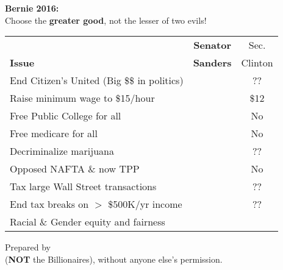 \newcommand{\checkbox}{\makebox[0pt][l]{$\square$}\raisebox{.15ex}{\hspace{0.1em}$\checkmark$}}
\setlength{\baselineskip}{8.25pt}
\vspace{-11pt}

\begin{center}
  {\Huge\bf Bernie 2016:}\\

  {\small Choose the {\bf greater good}, not the lesser of two evils!}\\[5pt]

  \begin{tabular}{l|@{\hskip 1pt}c@{\hskip 1pt}|@{\hskip 1pt}c}
\setlength{\tabcolsep}{0pt}
                  & {\bf\small Senator} & Sec.      \\
\bf Issue         & {\bf\small Sanders} & Clinton \\
\hline
End Citizen's United (Big \$\$ in politics)  & \checkbox &	??	\\
Raise minimum wage to \$15/hour              & \checkbox &	\$12	\\
Free Public College for all                  & \checkbox &	No	\\
Free medicare for all                        & \checkbox &	No	\\
Decriminalize marijuana                      & \checkbox &	??	\\
Opposed NAFTA \& now TPP                     & \checkbox &	No	\\
Tax large Wall Street transactions           & \checkbox &	??	\\
End tax breaks on $>$ \$500K/yr income       & \checkbox &	??	\\
Racial \& Gender equity and fairness         & \checkbox & \checkbox    \\

  \end{tabular}
\vspace{-9pt}
\begin{framed}
\small Prepared by \GroupName\\
({\bf NOT} the Billionaires), without anyone else's permission.\\
{\tt \GroupURL}
\end{framed}
\end{center}
\vspace{-18pt}
